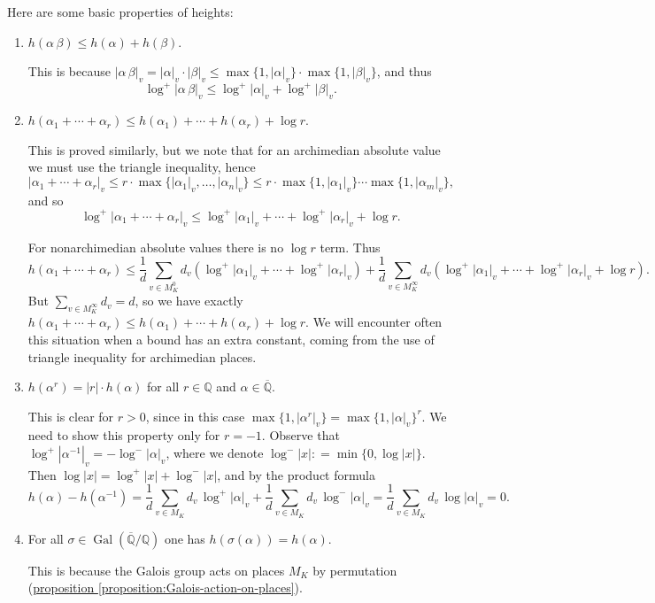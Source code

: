 \documentclass{article}
\newcommand{\refref}[2]{\hyperref[#2]{#1 \ref*{#2}}}
\theoremstyle{definition}
\DeclareMathOperator{\Gal}{Gal}
\newcommand{\dfn}{\mathrel{\mathop:}=}
\newcommand{\QQ}{\mathbb{Q}}
\begin{document}
Here are some basic properties of heights:
\begin{enumerate}
\item $h (\alpha\,\beta) \le h (\alpha) + h (\beta)$.

  This is because
  $|\alpha\,\beta|_v = |\alpha|_v \cdot |\beta|_v \le \max \{ 1, |\alpha|_v \}\cdot \max \{ 1, |\beta|_v \}$,
  and thus
  $$\log^+ |\alpha\,\beta|_v \le \log^+ |\alpha|_v + \log^+ |\beta|_v.$$

\item $h (\alpha_1 + \cdots + \alpha_r) \le h (\alpha_1) + \cdots + h (\alpha_r) + \log r$.

  This is proved similarly, but we note that for an archimedian absolute value
  we must use the triangle inequality, hence
  \[ |\alpha_1 + \cdots + \alpha_r|_v \le
    r\cdot \max\{|\alpha_1|_v, \ldots, |\alpha_n|_v\} \le
    r\cdot \max \{ 1, |\alpha_1|_v \} \cdots \max \{ 1, |\alpha_m|_v \}, \]
  and so
  \[ \log^+ |\alpha_1 + \cdots + \alpha_r|_v \le
  \log^+ |\alpha_1|_v + \cdots + \log^+ |\alpha_r|_v + \log r. \]

  For nonarchimedian absolute values there is no $\log r$ term. Thus
  \[ h (\alpha_1 + \cdots + \alpha_r) \le
    \frac{1}{d} \sum_{v \in M_K^0} d_v (\log^+ |\alpha_1|_v + \cdots + \log^+ |\alpha_r|_v) +
    \frac{1}{d} \sum_{v \in M_K^\infty} d_v (\log^+ |\alpha_1|_v + \cdots + \log^+ |\alpha_r|_v + \log r). \]
  But $\sum_{v\in M_K^\infty} d_v = d$, so we have exactly
  $h (\alpha_1 + \cdots + \alpha_r) \le h (\alpha_1) + \cdots + h (\alpha_r) + \log r$.
  We will encounter often this situation when a bound has an extra constant,
  coming from the use of triangle inequality for archimedian places.

\item $h (\alpha^r) = |r| \cdot h (\alpha)$ for all $r \in \QQ$ and
  $\alpha \in \overline{\QQ}$.

  This is clear for $r > 0$, since in this case
  $\max \{ 1, |\alpha^r|_v \} = \max \{ 1, |\alpha|_v \}^r$. We need to show
  this property only for $r = -1$. Observe that
  $\log^+ |\alpha^{-1}|_v = -\log^- |\alpha|_v$, where we denote
  $\log^- |x| \dfn \min \{ 0, \log |x| \}$. Then
  $\log |x| = \log^+ |x| + \log^- |x|$, and by the product formula
  \[ h (\alpha) - h (\alpha^{-1}) =
    \frac{1}{d} \sum_{v\in M_K} d_v\,\log^+ |\alpha|_v +
    \frac{1}{d} \sum_{v\in M_K} d_v\,\log^- |\alpha|_v =
    \frac{1}{d} \sum_{v\in M_K} d_v\,\log |\alpha|_v = 0. \]

\item For all $\sigma \in \Gal (\overline{\QQ}/\QQ)$ one has
  $h (\sigma (\alpha)) = h (\alpha)$.

  This is because the Galois group acts on places $M_K$ by permutation
  (\refref{proposition}{proposition:Galois-action-on-places}).
\end{enumerate}
\end{document}
